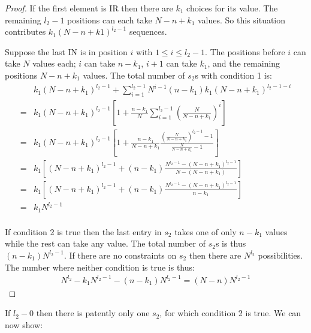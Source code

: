 \documentclass{article}
\begin{document}
\begin{proof}
    If the first element is IR then there are $k_1$ choices for its value. The remaining $l_2-1$ positions can each take $N-n+k_1$ values. So this situation contributes $k_1(N-n+k1)^{l_2-1}$ sequences.

    Suppose the last IN is in position $i$ with $1\leq i \leq l_2-1$. The positions before $i$ can take $N$ values each; $i$ can take $n-k_1$, $i+1$ can take $k_1$, and the remaining positions $N-n+k_1$ values. The total number of $s_2$s with condition 1 is:
    \begin{align*}
    &k_1(N-n+k_1)^{l_2-1} + \sum_{i=1}^{l_2-1}N^{i-1}(n-k_1)k_1(N-n+k_1)^{l_2-1-i}\\
    ={}& k_1(N-n+k_1)^{l_2-1}\left[1+\frac{n-k_1}{N}\sum_{i=1}^{l_2-1}\left(\frac{N}{N-n+k_1}\right)^i \right]\\
    ={}& k_1(N-n+k_1)^{l_2-1}\left[1+\frac{n-k_1}{N-n+k_1}\frac{\left(\frac{N}{N-n+k_1}\right)^{l_2-1} - 1}{\frac{N}{N-n+k_1} - 1} \right]\\
    ={}& k_1\left[(N-n+k_1)^{l_2-1}+(n-k_1)\frac{N^{l_2-1} - (N-n+k_1)^{l_2-1}}{N - (N-n+k_1)} \right]\\
    ={}& k_1\left[(N-n+k_1)^{l_2-1}+(n-k_1)\frac{N^{l_2-1} - (N-n+k_1)^{l_2-1}}{n-k_1} \right]\\
    ={}& k_1N^{l_2-1}\\
    \end{align*}

    If condition 2 is true then the last entry in $s_2$ takes one of only $n-k_1$ values while the rest can take any value. The total number of $s_2$s is thus $(n-k_1)N^{l_2-1}$.
    If there are no constraints on $s_2$ then there are $N^{l_2}$ possibilities. The number where neither condition is true is thus:
    \begin{align*}
        N^{l_2} - k_1N^{l_2-1} - (n-k_1)N^{l_2-1} = (N-n)N^{l_2-1}
    \end{align*}
\end{proof}
If $l_2-0$ then there is patently only one $s_2$, for which condition 2 is true. We can now show:
\end{document}
